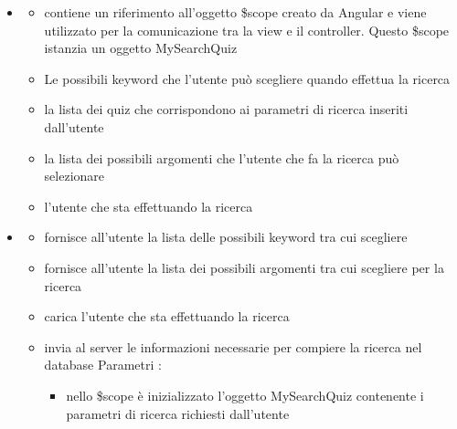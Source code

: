 \begin{itemize}
\item {}
\begin{itemize}
\item {}
\newline
contiene un riferimento all'oggetto \$scope creato da Angular e viene utilizzato per la comunicazione tra la view e il controller. Questo \$scope istanzia un oggetto MySearchQuiz
\item {}
\newline
Le possibili keyword che l'utente può scegliere quando effettua la ricerca
\item {}
\newline
la lista dei quiz che corrispondono ai parametri di ricerca inseriti dall'utente
\item {}
\newline
la lista dei possibili argomenti che l'utente che fa la ricerca può selezionare
\item {}
\newline
l'utente che sta effettuando la ricerca
\end{itemize}
\item {}
\begin{itemize}
\item {}
\newline
fornisce all'utente la lista delle possibili keyword tra cui scegliere
\newline
\item {}
\newline
fornisce all'utente la lista dei possibili argomenti tra cui scegliere per la ricerca
\newline
\item {}
\newline
carica l'utente che sta effettuando la ricerca
\newline
\item {}
\newline
invia al server le informazioni necessarie per compiere la ricerca nel database
\newline
Parametri :
\begin{itemize}
\item {}
\newline
nello \$scope è inizializzato l'oggetto MySearchQuiz contenente i parametri di ricerca richiesti dall'utente
\end{itemize}
\end{itemize}
\end{itemize}
